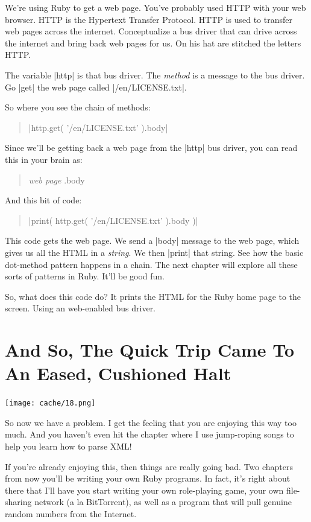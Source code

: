 \documentclass[12pt,twoside]{report}
\begin{document}
We're using Ruby to get a web page.  You've probably used HTTP with
your web browser.  HTTP is the Hypertext Transfer Protocol.  HTTP is
used to transfer web pages across the internet.  Conceptualize a bus
driver that can drive across the internet and bring back web pages for
us.  On his hat are stitched the letters HTTP.

The variable \rubyinline|http| is that bus driver.
The {\em method} is a message to the bus driver.  Go
\rubyinline|get| the web page called
\consoleinline|/en/LICENSE.txt|.

So where you see the chain of methods:

\begin{quote}
\rubyinline|http.get( '/en/LICENSE.txt' ).body|\end{quote}


Since we'll be getting back a web page from the
\rubyinline|http| bus driver, you can read this in
your brain as:

\begin{quote}
{\em web page} .body\end{quote}


And this bit of code:

\begin{quote}
\rubyinline|print( http.get( '/en/LICENSE.txt' ).body )|\end{quote}


This code gets the web page.  We send a
\rubyinline|body| message to the web page, which gives
us all the HTML in a {\em string}.  We then
\rubyinline|print| that string.  See how the basic
dot-method pattern happens in a chain.  The next chapter will explore
all these sorts of patterns in Ruby.  It'll be good fun.

So, what does this code do?  It prints the HTML for the Ruby home page
to the screen.  Using an web-enabled bus driver.


\section{And So, The Quick Trip Came To An Eased, Cushioned Halt}


	\texttt{[image: cache/18.png]}

So now we have a problem.  I get the feeling that you are enjoying
this way too much. And you haven't even hit the chapter where I use
jump-roping songs to help you learn how to parse XML!

If you're already enjoying this, then things are really going bad.
Two chapters from now you'll be writing your own Ruby programs.  In
fact, it's right about there that I'll have you start writing your own
role-playing game, your own file-sharing network (a la BitTorrent), as
well as a program that will pull genuine random numbers from the
Internet.
\end{document}
